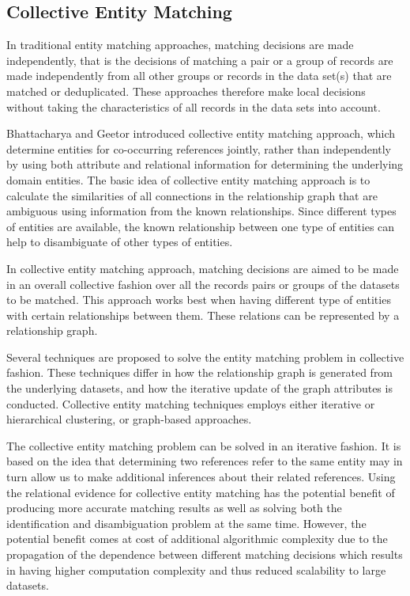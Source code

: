 \subsection{Collective Entity Matching}
In traditional entity matching approaches, matching decisions are made independently, that is the decisions of matching a pair or a group of records are made independently from all other groups or records in the data set(s) that are matched or deduplicated. These approaches therefore make local decisions without taking the characteristics of all records in the data sets into account.

Bhattacharya and Geetor\cite{BhGe07} introduced collective entity matching approach, which determine entities for co-occurring references jointly, rather than independently by using both attribute and relational information for determining the underlying domain entities\cite{Chri12}. The basic idea of collective entity matching approach is to calculate the similarities of all connections in the relationship graph that are ambiguous using information from the known relationships. Since different types of entities are available, the known relationship between one type of entities can help to disambiguate of other types of entities. 

In collective entity matching approach, matching decisions are aimed to be made in an overall collective fashion over all the records pairs or groups of the datasets to be matched. This approach works best when having different type of entities with certain relationships between them. These relations can be represented by a relationship graph. 

Several techniques are proposed to solve the entity matching problem in collective fashion. These techniques differ in how the relationship graph is generated from the underlying datasets, and how the iterative update of the graph attributes is conducted. Collective entity matching techniques employs either iterative or hierarchical clustering, or graph-based approaches.

The collective entity matching problem can be solved in an iterative fashion. It is based on the idea that determining two references refer to the same entity may in turn allow us to make additional inferences about their related references. Using the relational evidence for collective entity matching has the potential benefit of producing more accurate matching results as well as solving both the identification and disambiguation problem at the same time. However, the potential benefit comes at cost of additional algorithmic complexity due to the propagation of the dependence between different matching decisions which results in having higher computation complexity and thus reduced scalability to large datasets.

